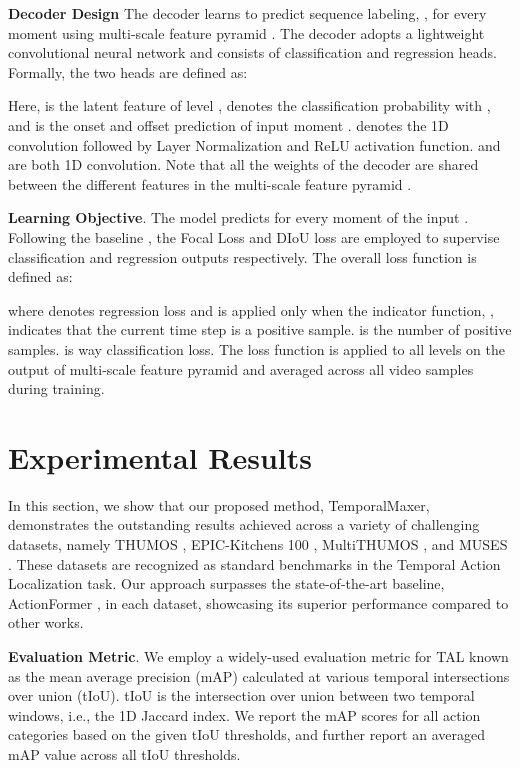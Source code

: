 \documentclass[10pt,twocolumn,letterpaper]{article}
\begin{document}
\textbf{Decoder Design}
The decoder  learns to predict sequence labeling, , for every moment using multi-scale feature pyramid . The decoder adopts a lightweight convolutional neural network and consists of classification and regression heads. Formally, the two heads are defined as:



Here,  is the latent feature of level ,  denotes the classification probability with , and  is the onset and offset prediction of input moment .  denotes the 1D convolution followed by Layer Normalization and ReLU activation function.  and  are both 1D convolution. Note that all the weights of the decoder are shared between the different features in the multi-scale feature pyramid .

\textbf{Learning Objective}. The model predicts  for every moment of the input . Following the baseline \cite{zhang2022actionformer}, the Focal Loss \cite{lin2017focal} and DIoU loss \cite{zheng2020distance} are employed to supervise classification and regression outputs respectively. The overall loss function is defined as:

where  denotes regression loss and is applied only when the indicator function, , indicates that the current time step  is a positive sample.  is the number of positive samples.  is  way classification loss. The loss function  is applied to all levels on the output of multi-scale feature pyramid  and averaged across all video samples during training.



 \section{Experimental Results}
In this section, we show that our proposed method, TemporalMaxer, demonstrates the outstanding results achieved across a variety of challenging datasets, namely THUMOS \cite{idrees2017thumos}, EPIC-Kitchens 100 \cite{damen2020rescaling}, MultiTHUMOS \cite{yeung2018every}, and MUSES \cite{liu2021multi}. These datasets are recognized as standard benchmarks in the Temporal Action Localization task. Our approach surpasses the state-of-the-art baseline, ActionFormer \cite{zhang2022actionformer}, in each dataset, showcasing its superior performance compared to other works.

\textbf{Evaluation Metric}. We employ a widely-used evaluation metric for TAL known as the mean average precision (mAP) calculated at various temporal intersections over union (tIoU). tIoU is the intersection over union between two temporal windows, i.e., the 1D Jaccard index. We report the mAP scores for all action categories based on the given tIoU thresholds, and further report an averaged mAP value across all tIoU thresholds.
\end{document}
